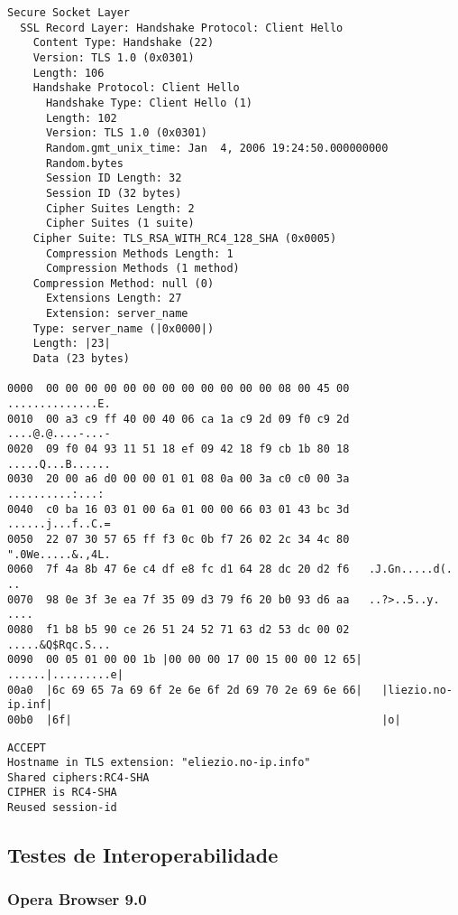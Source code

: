 \begin{lstlisting}[caption=Segunda Conexão -- Decodificação da mensagem \tlsHsCh]
Secure Socket Layer 
  SSL Record Layer: Handshake Protocol: Client Hello 
    Content Type: Handshake (22) 
    Version: TLS 1.0 (0x0301) 
    Length: 106 
    Handshake Protocol: Client Hello 
      Handshake Type: Client Hello (1) 
      Length: 102 
      Version: TLS 1.0 (0x0301) 
      Random.gmt_unix_time: Jan  4, 2006 19:24:50.000000000 
      Random.bytes 
      Session ID Length: 32 
      Session ID (32 bytes) 
      Cipher Suites Length: 2 
      Cipher Suites (1 suite) 
	Cipher Suite: TLS_RSA_WITH_RC4_128_SHA (0x0005) 
      Compression Methods Length: 1 
      Compression Methods (1 method) 
	Compression Method: null (0) 
      Extensions Length: 27 
      Extension: server_name 
	Type: server_name (|0x0000|) 
	Length: |23| 
	Data (23 bytes)

0000  00 00 00 00 00 00 00 00 00 00 00 00 08 00 45 00   ..............E. 
0010  00 a3 c9 ff 40 00 40 06 ca 1a c9 2d 09 f0 c9 2d   ....@.@....-...- 
0020  09 f0 04 93 11 51 18 ef 09 42 18 f9 cb 1b 80 18   .....Q...B...... 
0030  20 00 a6 d0 00 00 01 01 08 0a 00 3a c0 c0 00 3a    ..........:...: 
0040  c0 ba 16 03 01 00 6a 01 00 00 66 03 01 43 bc 3d   ......j...f..C.= 
0050  22 07 30 57 65 ff f3 0c 0b f7 26 02 2c 34 4c 80   ".0We.....&.,4L. 
0060  7f 4a 8b 47 6e c4 df e8 fc d1 64 28 dc 20 d2 f6   .J.Gn.....d(. .. 
0070  98 0e 3f 3e ea 7f 35 09 d3 79 f6 20 b0 93 d6 aa   ..?>..5..y. .... 
0080  f1 b8 b5 90 ce 26 51 24 52 71 63 d2 53 dc 00 02   .....&Q$Rqc.S... 
0090  00 05 01 00 00 1b |00 00 00 17 00 15 00 00 12 65|   ......|.........e|
00a0  |6c 69 65 7a 69 6f 2e 6e 6f 2d 69 70 2e 69 6e 66|   |liezio.no-ip.inf|
00b0  |6f|                                                |o|
\end{lstlisting}

\begin{lstlisting}[caption=Segunda Conexão -- Saída da aplicação {\tt s\_server}]
ACCEPT 
Hostname in TLS extension: "eliezio.no-ip.info" 
Shared ciphers:RC4-SHA 
CIPHER is RC4-SHA 
Reused session-id
\end{lstlisting}

\subsection{Testes de Interoperabilidade}

\subsubsection*{Opera Browser 9.0}

